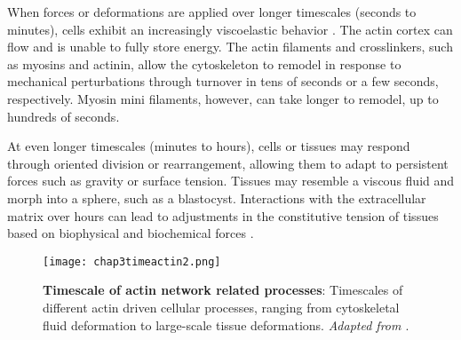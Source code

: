 When forces or deformations are applied over longer timescales (seconds to minutes), cells exhibit an increasingly viscoelastic behavior \cite{kollmannsberger2011}. The actin cortex can flow and is unable to fully store energy. The actin filaments and crosslinkers, such as myosins and actinin, allow the cytoskeleton to remodel in response to mechanical perturbations through turnover in tens of seconds or a few seconds, respectively. Myosin mini filaments, however, can take longer to remodel, up to hundreds of seconds.

At even longer timescales (minutes to hours), cells or tissues may respond through oriented division or rearrangement, allowing them to adapt to persistent forces such as gravity or surface tension. Tissues may resemble a viscous fluid and morph into a sphere, such as a blastocyst. Interactions with the extracellular matrix over hours can lead to adjustments in the constitutive tension of tissues based on biophysical and biochemical forces \cite{porazinski2015}.

\begin{figure}
	\centering
	\texttt{[image: chap3timeactin2.png]}
	\caption{\label{fig_3_5} 
		\textbf{Timescale of actin network related processes}: Timescales of different actin driven cellular processes, ranging from cytoskeletal fluid deformation to large-scale tissue deformations. \textit{Adapted from \cite{kelkar2020}}.}
\end{figure}

